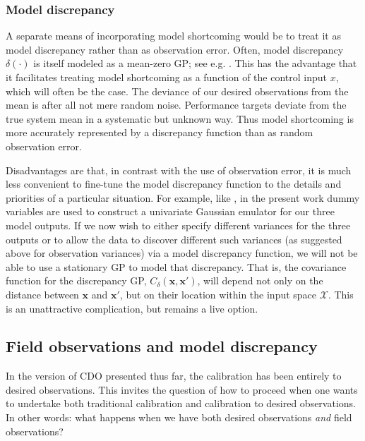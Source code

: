 \documentclass{article}
\begin{document}

\subsubsection{Model discrepancy}\label{mod_disc}

A separate means of incorporating model shortcoming would be to treat it as model discrepancy rather than as observation error. Often, model discrepancy $\delta(\cdot)$ is itself modeled as a mean-zero GP; see e.g. \cite{Williams2006}. This has the advantage that it facilitates treating model shortcoming as a function of the control input $x$, which will often be the case. The deviance of our desired observations from the mean is after all not mere random noise. Performance targets deviate from the true system mean in a systematic but unknown way. Thus model shortcoming is more accurately represented by a discrepancy function than as random observation error.

Disadvantages are that, in contrast with the use of observation error, it is much less convenient to fine-tune the model discrepancy function to the details and priorities of a particular situation. For example, like \cite{Williams2006}, in the present work dummy variables are used to construct a univariate Gaussian emulator for our three model outputs. If we now wish to either specify different variances for the three outputs or to allow the data to discover different such variances (as suggested above for observation variances) via a model discrepancy function, we will not be able to use a stationary GP to model that discrepancy. That is, the covariance function for the discrepancy GP, $C_\delta(\mathbf x,\mathbf x')$, will depend not only on the distance between $\mathbf x$ and $\mathbf x'$, but on their location within the input space $\mathcal X$. This is an unattractive complication, but remains a live option.

\subsection{Field observations and model discrepancy}

In the version of CDO presented thus far, the calibration has been entirely to desired observations. This invites the question of how to proceed when one wants to undertake both traditional calibration and calibration to desired observations. In other words: what happens when we have both desired observations \emph{and} field observations? 
\end{document}
